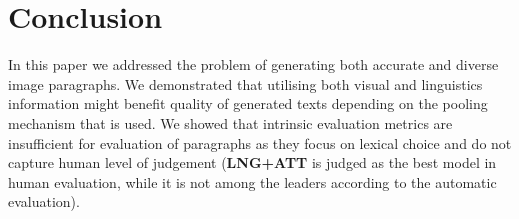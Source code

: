 \documentclass[11pt,a4paper]{article}
\begin{document}
\section{Conclusion}


In this paper we addressed the problem of generating both accurate and diverse image paragraphs.
We demonstrated that utilising both visual and linguistics information might benefit quality of generated texts depending on the pooling mechanism that is used.
We showed that intrinsic evaluation metrics are insufficient for evaluation of paragraphs as they focus on lexical choice and do not capture human level of judgement (\textbf{LNG+ATT} is judged as the best model in human evaluation, while it is not among the leaders according to the automatic evaluation).








\end{document}
